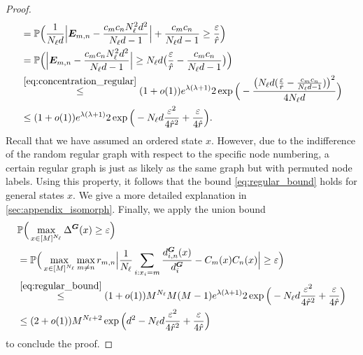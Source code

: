 \documentclass[a4paper,
               10pt,
               pdftex,
               normalheadings,
               headsepline,
               footsepline,
               headinclude,
               footinclude,
               DIV=14,
               abstracton]
{scrartcl}
\newcommand{\rv}[1]{\bm{#1}}
\begin{document}
\begin{proof}
\begin{align}
    &= \mathbb{P}\Big( \frac{1}{N_\ell d} \Big\lvert  \rv{E}_{m,n} - \frac{c_m c_n N_\ell^2 d^2}{N_\ell d - 1}  \Big\rvert + \frac{c_m c_n}{N_\ell d - 1} \geq \frac{\varepsilon}{\hat{r}} \Big)\\
    &= \mathbb{P}\Big(\Big\lvert \rv{E}_{m,n} -\frac{c_m c_n N_\ell^2 d^2}{N_\ell d - 1}  \Big\rvert \geq N_\ell d \big(\frac{\varepsilon}{\hat{r}} - \frac{c_m c_n}{N_\ell d - 1}\big) \Big)\\
    &\overset{\eqref{eq:concentration_regular}}{\leq} (1+o(1)) e^{\lambda(\lambda+1)} 2 \exp\Big(-\frac{\big(N_\ell d (\frac{\varepsilon}{\hat{r}} - \frac{c_m c_n}{N_\ell d - 1})\big)^2}{4 N_\ell d}\Big)\\
    &\leq (1+o(1)) e^{\lambda(\lambda+1)} 2 \exp\Big( - N_\ell d \frac{\varepsilon^2}{4 \hat{r}^2} + \frac{\varepsilon}{4 \hat{r}} \Big). \label{eq:regular_bound}
\end{align}
Recall that we have assumed an ordered state $x$. However, due to the indifference of the random regular graph with respect to the specific node numbering, a certain regular graph is just as likely as the same graph but with permuted node labels. Using this property, it follows that the bound \eqref{eq:regular_bound} holds for general states $x$. We give a more detailed explanation in \cref{sec:appendix_isomorph}.
Finally, we apply the union bound
\begin{align}
    &\mathbb{P}\Big(\max_{x\in [M]^{N_\ell}} \Delta^{\rv{G}}(x) \geq \varepsilon \Big)\\
    &= \mathbb{P}\Big(\max_{x \in [M]^{N_\ell}} \max_{m \neq n} r_{m,n} \Big\lvert \frac{1}{N_\ell} \sum_{i : x_{i} = m} \frac{d^{\rv{G}}_{i,n}(x)}{d^{\rv{G}}_i} - C_m(x) C_n(x) \Big\rvert \geq \varepsilon\Big)\\
    &\overset{\eqref{eq:regular_bound}}{\leq} (1 + o(1)) M^{N_\ell} M(M-1)  e^{\lambda(\lambda+1)} 2 \exp\Big( - N_\ell d \frac{\varepsilon^2}{4\hat{r}^2} + \frac{\varepsilon}{4\hat{r}} \Big) \\
    &\leq (2+o(1)) M^{N_\ell+2} \exp\Big(d^2 - N_\ell d \frac{\varepsilon^2}{4 \hat{r}^2} + \frac{\varepsilon}{4 \hat{r}}\Big)
\end{align}
to conclude the proof.
\end{proof}
\end{document}
